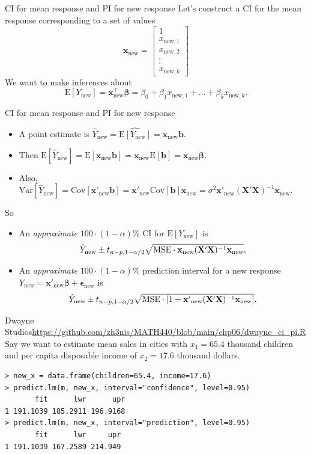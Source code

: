 \documentclass{beamer}
\newcommand{\E}{\mathrm{E}}
\newcommand{\Var}{\mathrm{Var}}
\newcommand{\Cov}{\mathrm{Cov}}
\begin{document}
\begin{frame}{CI for mean response and PI for new response}
Let's construct a CI for the mean response corresponding to a set of values
$$
\mathbf{x}_{\text{new}}=\begin{bmatrix}
1\\x_{\text{new},1}\\x_{\text{new},2}\\\vdots\\x_{\text{new},k}
\end{bmatrix}
$$
\pause We want to make inferences about
$$
\E[Y_{\text{new}}]=\mathbf{x}_\text{new}^\top\boldsymbol\beta=\beta_0+\beta_1 x_{\text{new},1}+\ldots+\beta_k x_{\text{new},k}.
$$
\end{frame}

\begin{frame}{CI for mean response and PI for new response}
\begin{itemize}
\item A point estimate is $\hat{Y}_\text{new}=\widehat{\E[Y_\text{new}]}=\mathbf{x}_\text{new}\mathbf{b}$.
\item\pause Then $\E[\hat{Y}_\text{new}]=\E[\mathbf{x}_\text{new}\mathbf{b}]=\mathbf{x}_\text{new}\E[\mathbf{b}]=\mathbf{x}_\text{new}\boldsymbol\beta$.
\item\pause Also, $\Var[\hat{Y}_\text{new}]=\Cov[\mathbf{x'}_\text{new}\mathbf{b}]=\mathbf{x'}_\text{new}\Cov[\mathbf{b}]\mathbf{x}_\text{new}=\sigma^2\mathbf{x'}_\text{new}(\mathbf{X'X})^{-1}\mathbf{x}_\text{new}$.
\end{itemize}
\pause So
\begin{itemize}
\item\pause An \textit{approximate} $100\cdot(1-\alpha)$\% CI for $\E[Y_\text{new}]$ is
$$
\hat{Y}_\text{new}\pm t_{n-p,1-\alpha/2}\sqrt{{\rm MSE}\cdot\mathbf{x}_\text{new}(\mathbf{X'X})^{-1}\mathbf{x}_\text{new}},
$$
\item\pause An \textit{approximate} $100\cdot(1-\alpha)$\% prediction interval for a new response $Y_\text{new}=\mathbf{x'}_\text{new}\boldsymbol\beta+\boldsymbol\epsilon_\text{new}$ is
$$
\hat{Y}_\text{new}\pm t_{n-p,1-\alpha/2}\sqrt{{\rm MSE}\cdot[1+\mathbf{x'}_\text{new}(\mathbf{X'X})^{-1}\mathbf{x}_\text{new}]},
$$
\end{itemize}
\end{frame}

\begin{frame}[fragile]{Dwayne Studios}{\url{https://github.com/zh3nis/MATH440/blob/main/chp06/dwayne_ci_pi.R}}
Say we want to estimate mean sales in cities with $x_1 = 65.4$ thousand children and per capita disposable income of
$x_2 = 17.6$ thousand dollars. 
\begin{small}
\begin{verbatim}
> new_x = data.frame(children=65.4, income=17.6)
> predict.lm(m, new_x, interval="confidence", level=0.95)
       fit      lwr      upr
1 191.1039 185.2911 196.9168
> predict.lm(m, new_x, interval="prediction", level=0.95)
       fit      lwr     upr
1 191.1039 167.2589 214.949    
\end{verbatim}
\end{small}
\end{frame}
\end{document}
